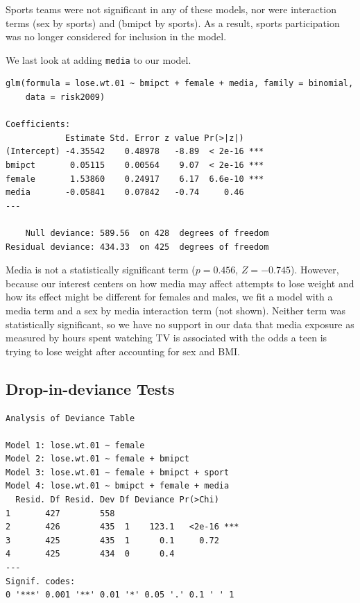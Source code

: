 \documentclass[
]{krantz}
\begin{document}
Sports teams were not significant in any of these models, nor were interaction terms (sex by sports) and (bmipct by sports). As a result, sports participation was no longer considered for inclusion in the model.

We last look at adding \texttt{media} to our model.

\begin{verbatim}
glm(formula = lose.wt.01 ~ bmipct + female + media, family = binomial, 
    data = risk2009)

Coefficients:
            Estimate Std. Error z value Pr(>|z|)    
(Intercept) -4.35542    0.48978   -8.89  < 2e-16 ***
bmipct       0.05115    0.00564    9.07  < 2e-16 ***
female       1.53860    0.24917    6.17  6.6e-10 ***
media       -0.05841    0.07842   -0.74     0.46    
---

    Null deviance: 589.56  on 428  degrees of freedom
Residual deviance: 434.33  on 425  degrees of freedom
\end{verbatim}

Media is not a statistically significant term (\(p=0.456\), \(Z=-0.745\)). However, because our interest centers on how media may affect attempts to lose weight and how its effect might be different for females and males, we fit a model with a media term and a sex by media interaction term (not shown). Neither term was statistically significant, so we have no support in our data that media exposure as measured by hours spent watching TV is associated with the odds a teen is trying to lose weight after accounting for sex and BMI.

\hypertarget{drop-in-deviance-tests}{%
\subsection{Drop-in-deviance Tests}\label{drop-in-deviance-tests}}

\begin{verbatim}
Analysis of Deviance Table

Model 1: lose.wt.01 ~ female
Model 2: lose.wt.01 ~ female + bmipct
Model 3: lose.wt.01 ~ female + bmipct + sport
Model 4: lose.wt.01 ~ bmipct + female + media
  Resid. Df Resid. Dev Df Deviance Pr(>Chi)    
1       427        558                         
2       426        435  1    123.1   <2e-16 ***
3       425        435  1      0.1     0.72    
4       425        434  0      0.4             
---
Signif. codes:  
0 '***' 0.001 '**' 0.01 '*' 0.05 '.' 0.1 ' ' 1
\end{verbatim}
\end{document}

